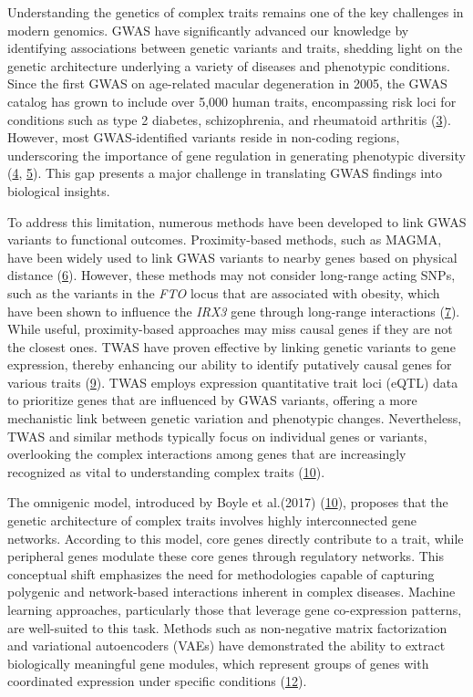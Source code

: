 Understanding the genetics of complex traits remains one of the key challenges in modern genomics.
GWAS have significantly advanced our knowledge by identifying associations between genetic variants and traits, shedding light on the genetic architecture underlying a variety of diseases and phenotypic conditions.
Since the first GWAS on age-related macular degeneration in 2005, the GWAS catalog has grown to include over 5,000 human traits, encompassing risk loci for conditions such as type 2 diabetes, schizophrenia, and rheumatoid arthritis (\protect\hyperlink{ref-HicyXvA4}{3}).
However, most GWAS-identified variants reside in non-coding regions, underscoring the importance of gene regulation in generating phenotypic diversity (\protect\hyperlink{ref-BqjxxhyF}{4}, \protect\hyperlink{ref-9Pr9idng}{5}).
This gap presents a major challenge in translating GWAS findings into biological insights.

To address this limitation, numerous methods have been developed to link GWAS variants to functional outcomes.
Proximity-based methods, such as MAGMA, have been widely used to link GWAS variants to nearby genes based on physical distance (\protect\hyperlink{ref-19XiXgYmd}{6}).
However, these methods may not consider long-range acting SNPs, such as the variants in the \emph{FTO} locus that are associated with obesity, which have been shown to influence the \emph{IRX3} gene through long-range interactions (\protect\hyperlink{ref-167QL5tMV}{7}).
While useful, proximity-based approaches may miss causal genes if they are not the closest ones.
TWAS have proven effective by linking genetic variants to gene expression, thereby enhancing our ability to identify putatively causal genes for various traits (\protect\hyperlink{ref-l6ogswV3}{9}).
TWAS employs expression quantitative trait loci (eQTL) data to prioritize genes that are influenced by GWAS variants, offering a more mechanistic link between genetic variation and phenotypic changes.
Nevertheless, TWAS and similar methods typically focus on individual genes or variants, overlooking the complex interactions among genes that are increasingly recognized as vital to understanding complex traits (\protect\hyperlink{ref-vpIDZCSa}{10}).

The omnigenic model, introduced by Boyle et al.(2017) (\protect\hyperlink{ref-vpIDZCSa}{10}), proposes that the genetic architecture of complex traits involves highly interconnected gene networks.
According to this model, core genes directly contribute to a trait, while peripheral genes modulate these core genes through regulatory networks.
This conceptual shift emphasizes the need for methodologies capable of capturing polygenic and network-based interactions inherent in complex diseases.
Machine learning approaches, particularly those that leverage gene co-expression patterns, are well-suited to this task.
Methods such as non-negative matrix factorization and variational autoencoders (VAEs) have demonstrated the ability to extract biologically meaningful gene modules, which represent groups of genes with coordinated expression under specific conditions (\protect\hyperlink{ref-170T6ip47}{12}).

